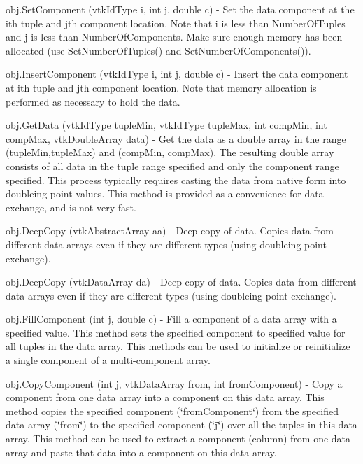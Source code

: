 \begin{DoxyItemize}
\item {\ttfamily obj.\-Set\-Component (vtk\-Id\-Type i, int j, double c)} -\/ Set the data component at the ith tuple and jth component location. Note that i is less than Number\-Of\-Tuples and j is less than Number\-Of\-Components. Make sure enough memory has been allocated (use Set\-Number\-Of\-Tuples() and Set\-Number\-Of\-Components()).  
\item {\ttfamily obj.\-Insert\-Component (vtk\-Id\-Type i, int j, double c)} -\/ Insert the data component at ith tuple and jth component location. Note that memory allocation is performed as necessary to hold the data.  
\item {\ttfamily obj.\-Get\-Data (vtk\-Id\-Type tuple\-Min, vtk\-Id\-Type tuple\-Max, int comp\-Min, int comp\-Max, vtk\-Double\-Array data)} -\/ Get the data as a double array in the range (tuple\-Min,tuple\-Max) and (comp\-Min, comp\-Max). The resulting double array consists of all data in the tuple range specified and only the component range specified. This process typically requires casting the data from native form into doubleing point values. This method is provided as a convenience for data exchange, and is not very fast.  
\item {\ttfamily obj.\-Deep\-Copy (vtk\-Abstract\-Array aa)} -\/ Deep copy of data. Copies data from different data arrays even if they are different types (using doubleing-\/point exchange).  
\item {\ttfamily obj.\-Deep\-Copy (vtk\-Data\-Array da)} -\/ Deep copy of data. Copies data from different data arrays even if they are different types (using doubleing-\/point exchange).  
\item {\ttfamily obj.\-Fill\-Component (int j, double c)} -\/ Fill a component of a data array with a specified value. This method sets the specified component to specified value for all tuples in the data array. This methods can be used to initialize or reinitialize a single component of a multi-\/component array.  
\item {\ttfamily obj.\-Copy\-Component (int j, vtk\-Data\-Array from, int from\-Component)} -\/ Copy a component from one data array into a component on this data array. This method copies the specified component (\char`\"{}from\-Component\char`\"{}) from the specified data array (\char`\"{}from\char`\"{}) to the specified component (\char`\"{}j\char`\"{}) over all the tuples in this data array. This method can be used to extract a component (column) from one data array and paste that data into a component on this data array.  

\end{DoxyItemize}

